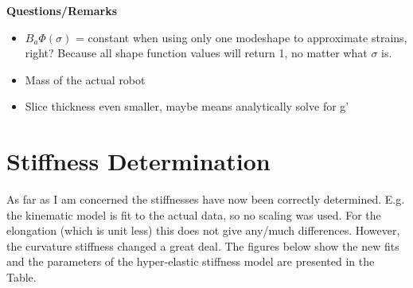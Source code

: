 \textbf{Questions/Remarks}
\begin{itemize}
    \item $B_a\Phi(\sigma)$ = constant when using only one modeshape to  approximate strains, right? Because all shape function values will return 1, no matter what $\sigma$ is.
    \item Mass of the actual robot 
    \item Slice thickness even smaller, maybe means analytically solve for g'
\end{itemize}




\section{Stiffness Determination}


As far as I am concerned the stiffnesses have now been correctly determined. E.g. the kinematic model is fit to the actual data, so no scaling was used. For the elongation (which is unit less) this does not give any/much differences. However, the curvature stiffness changed a great deal.  The figures below show the  new fits and the parameters of the hyper-elastic stiffness model are presented in the Table.


